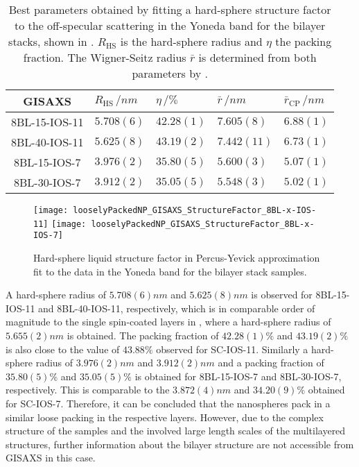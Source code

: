 \documentclass[\main/dresen_thesis.tex]{subfiles}
\begin{document}
  \begin{table}[tb]
    \centering
    \caption{\label{tab:looselyPackedNP:bilayerStacks:gisaxs}Best parameters obtained by fitting a hard-sphere structure factor to the off-specular scattering in the Yoneda band for the bilayer stacks, shown in . $R_\mathrm{HS}$ is the hard-sphere radius and $\eta$ the packing fraction. The Wigner-Seitz radius $\bar{r}$ is determined from both parameters by .}
    \begin{tabular}{ c | l | l | l | l }
      \rule{0pt}{2ex} \textbf{GISAXS}  & $R_\mathrm{HS} \, / \unit{nm}$ &$\eta \, / \unit{\%}$ & $\bar{r} \, / \unit{nm}$ & $\bar{r}_\mathrm{CP} \, / \unit{nm}$ \\
      \hline
      \rule{0pt}{2ex} 8BL-15-IOS-11    & $5.708(6)$    & $42.28(1)$ & $7.605(8)$  & $6.88(1)$\\
      \rule{0pt}{2ex} 8BL-40-IOS-11    & $5.625(8)$    & $43.19(2)$ & $7.442(11)$ & $6.73(1)$\\
      \rule{0pt}{2ex} 8BL-15-IOS-7     & $3.976(2)$    & $35.80(5)$ & $5.600(3)$  & $5.07(1)$\\
      \rule{0pt}{2ex} 8BL-30-IOS-7     & $3.912(2)$    & $35.05(5)$ & $5.548(3)$  & $5.02(1)$\\
      \hline
    \end{tabular}
  \end{table}

  \begin{figure}[tb]
    \centering
    \texttt{[image: looselyPackedNP\_GISAXS\_StructureFactor\_8BL-x-IOS-11]}
    \texttt{[image: looselyPackedNP\_GISAXS\_StructureFactor\_8BL-x-IOS-7]}
    \caption{\label{fig:looselyPackedNP:bilayerStacks:gisaxsHardSphereSF}Hard-sphere liquid structure factor in Percus-Yevick approximation fit to the data in the Yoneda band for the bilayer stack samples.}
  \end{figure}

  A hard-sphere radius of $5.708(6) \unit{nm}$ and $5.625(8) \unit{nm}$ is observed for 8BL-15-IOS-11 and 8BL-40-IOS-11, respectively, which is in comparable order of magnitude to the single spin-coated layers in , where a hard-sphere radius of $5.655(2) \unit{nm}$ is obtained.
  The packing fraction of $42.28(1) \%$ and $43.19(2) \%$ is also close to the value of $43.88 \%$ observed for SC-IOS-11.
  Similarly a hard-sphere radius of $3.976(2) \unit{nm}$ and $3.912(2) \unit{nm}$ and a packing fraction of $35.80(5)\%$ and $35.05(5) \%$ is obtained for 8BL-15-IOS-7 and 8BL-30-IOS-7, respectively.
  This is comparable to the $3.872(4) \unit{nm}$ and $34.20(9) \%$ obtained for SC-IOS-7.
  Therefore, it can be concluded that the nanospheres pack in a similar loose packing in the respective layers.
  However, due to the complex structure of the samples and the involved large length scales of the multilayered structures, further information about the bilayer structure are not accessible from GISAXS in this case.
\end{document}
